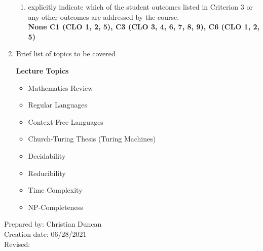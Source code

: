 \begin{enumerate}[1.]
\begin{enumerate}
\item explicitly indicate which of the student outcomes listed in Criterion 3 or any other outcomes are addressed by the course.\\
  {\bfseries
    None
    C1 (CLO 1, 2, 5),
    C3 (CLO 3, 4, 6, 7, 8, 9),
    C6 (CLO 1, 2, 5)
  }
\end{enumerate}

\item Brief list of topics to be covered\\
  {\bfseries
    Lecture Topics
    \begin{itemize}
    \item Mathematics Review
    \item Regular Languages
    \item Context-Free Languages
    \item Church-Turing Thesis (Turing Machines)
    \item Decidability
    \item Reducibility
    \item Time Complexity
    \item NP-Completeness
    \end{itemize}
  }

\end{enumerate}

\noindent Prepared by: Christian Duncan\\
\noindent Creation date: 06/28/2021\\
\noindent Revised:\\
